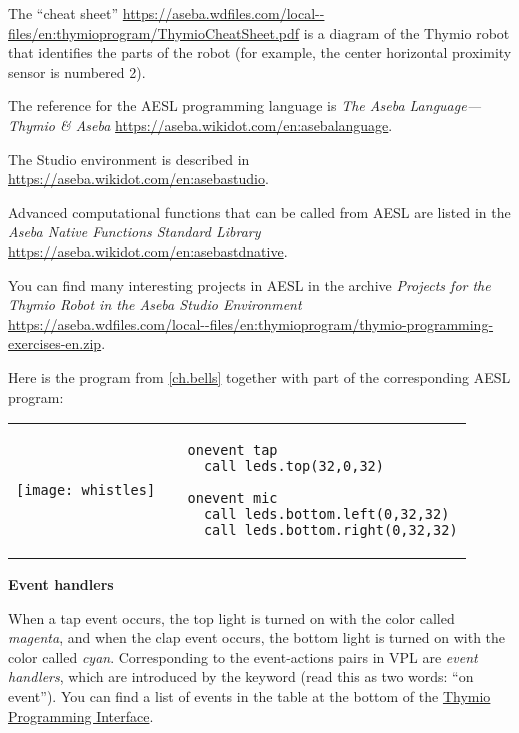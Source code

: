 The ``cheat sheet''
\url{https://aseba.wdfiles.com/local--files/en:thymioprogram/ThymioCheatSheet.pdf}
is a diagram of the Thymio robot that identifies the parts of the robot
(for example, the center horizontal proximity sensor is numbered 2).

The reference for the AESL programming language is
\textit{The Aseba Language---Thymio \& Aseba}
\url{https://aseba.wikidot.com/en:asebalanguage}.

The Studio environment is described in
\url{https://aseba.wikidot.com/en:asebastudio}.

Advanced computational functions that can be called from AESL are listed
in the \textit{Aseba Native Functions Standard Library} 
\url{https://aseba.wikidot.com/en:asebastdnative}.

You can find many interesting projects in AESL in the archive
\textit{Projects for the Thymio Robot in the Aseba Studio
Environment}\\
\url{https://aseba.wdfiles.com/local--files/en:thymioprogram/thymio-programming-exercises-en.zip}.



Here is the program  from \cref{ch.bells} together with
part of the corresponding AESL program:
 
\begin{center}
\begin{tabular}{ll}
\texttt{[image: whistles]} &
\begin{minipage}[b]{.5\textwidth}
\begin{footnotesize}
\begin{verbatim}
  onevent tap
    call leds.top(32,0,32)
  
  onevent mic
    call leds.bottom.left(0,32,32)
    call leds.bottom.right(0,32,32)
\end{verbatim}
\end{footnotesize}
\vspace*{8ex}
\end{minipage}
\end{tabular}
\end{center}

\textbf{\large Event handlers}

When a tap event occurs, the top light is turned on with the color
called \emph{magenta}, and when the clap event occurs, the bottom light
is turned on with the color called \emph{cyan}. Corresponding to the
event-actions pairs in VPL are \emph{event handlers}, which are
introduced by the keyword  (read this as two words: ``on
event''). You can find a list of events in the table at the bottom of
the \href{https://aseba.wikidot.com/en:thymioapi}{Thymio Programming
Interface}.

